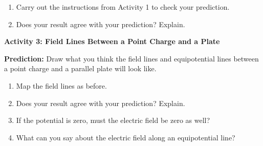 \begin{enumerate}
\item Carry out the instructions from Activity 1 to check your prediction.
\item Does your result agree with your prediction? Explain.\vspace{15mm}

\end{enumerate}
\textbf{Activity 3: Field Lines Between a Point Charge and a Plate}

\textbf{Prediction:} Draw what you think the field lines and equipotential
lines between a point charge and a parallel plate will look like.
\vspace{1in}

\begin{enumerate}
\item Map the field lines as before.
\item Does your result agree with your prediction? Explain.\vspace{15mm}

\item If the potential is zero, must the electric field be zero as well?\vspace{15mm}

\item What can you say about the electric field along an equipotential line?\vspace{15mm}

\end{enumerate}



